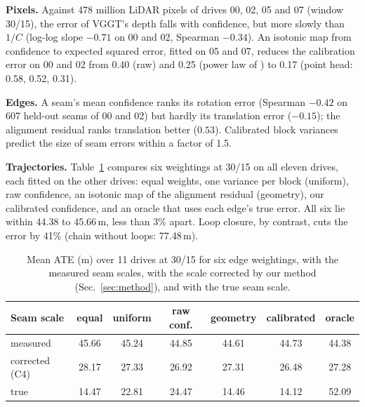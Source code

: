 \documentclass[conference]{IEEEtran}
\begin{document}
\textbf{Pixels.} Against 478 million LiDAR pixels of drives 00, 02, 05 and 07 (window 30/15), the error of VGGT's depth falls with
confidence, but more slowly than $1/C$ (log-log slope $-0.71$ on 00 and 02, Spearman $-0.34$). An isotonic map from
confidence to expected squared error, fitted on 05 and 07, reduces the calibration error on 00 and 02 from 0.40 (raw)
and 0.25 (power law of \cite{audit}) to 0.17 (point head: 0.58, 0.52, 0.31).

\textbf{Edges.} A seam's mean confidence ranks its rotation error (Spearman $-0.42$ on 607 held-out seams of 00 and 02)
but hardly its translation error ($-0.15$); the alignment residual ranks translation better ($0.53$). Calibrated block
variances predict the size of seam errors within a factor of 1.5.

\textbf{Trajectories.} Table~\ref{tab:weights} compares six weightings at 30/15 on all eleven drives, each fitted on the
other drives: equal weights, one variance per block (uniform), raw confidence, an isotonic map of the alignment
residual (geometry), our calibrated confidence, and an oracle that uses each edge's true error. All six lie within
44.38 to 45.66\,m, less than 3\% apart. Loop closure, by contrast, cuts the error by 41\% (chain without loops:
77.48\,m).

\begin{table}[t]
\centering
\caption{Mean ATE (m) over 11 drives at 30/15 for six edge weightings, with the measured seam scales, with the scale
corrected by our method (Sec.~\ref{sec:method}), and with the true seam scale.}
\label{tab:weights}
\footnotesize
\begin{tabular}{lcccccc}
\toprule
Seam scale & equal & uniform & raw conf. & geometry & calibrated & oracle \\
\midrule
measured & 45.66 & 45.24 & 44.85 & 44.61 & 44.73 & 44.38 \\
corrected (C4) & 28.17 & 27.33 & 26.92 & 27.31 & 26.48 & 27.28 \\
true & 14.47 & 22.81 & 24.47 & 14.46 & 14.12 & 52.09 \\
\bottomrule
\end{tabular}
\end{table}
\end{document}

